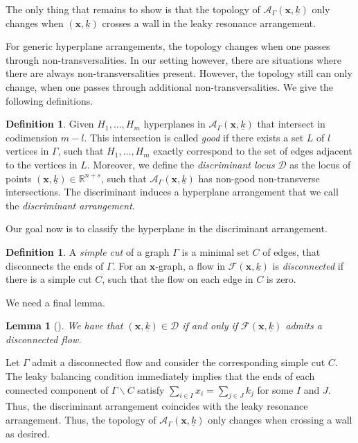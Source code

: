 \documentclass[10pt,a4paper,oneside,no-math,reqno]{amsart}%
\theoremstyle{plain}
\newtheorem{lemma}[theorem]{Lemma}
\theoremstyle{definition}
\newtheorem{definition}[theorem]{Definition}
\theoremstyle{remark}
\numberwithin{equation}{section}
\newcommand{\1}{\mathds{1}}
\newcommand{\<}{\langle}
\renewcommand{\>}{\rangle}
\begin{document}
 
 The only thing that remains to show is that the topology of $\mathcal{A}_\Gamma(\textbf{x},\underline{k})$ only changes when $(\textbf{x},\underline{k})$ crosses a wall in the leaky resonance arrangement.

 For generic hyperplane arrangements, the topology changes when one passes through non-transversalities. In our setting however, there are situations where there are always non-transversalities present. However, the topology still can only change, when one passes through additional non-transversalities. We give the following definitions.

 \begin{definition}
     Given $H_1,\dots,H_m$ hyperplanes in $\mathcal{A}_\Gamma(\textbf{x},\underline{k})$ that intersect in codimension $m-l$. This intersection is called \emph{good} if there exists a set $L$ of $l$ vertices in $\Gamma$, such that $H_1,\dots,H_m$ exactly correspond to the set of edges adjacent to the vertices in $L$. Moreover, we define the \emph{discriminant locus} $\mathcal{D}$ as the locus of points $(\textbf{x},\underline{k})\in\mathbb{R}^{n+s}$, such that $\mathcal{A}_\Gamma(\textbf{x},\underline{k})$ has non-good non-transverse intersections. The discriminant induces a hyperplane arrangement that we call the \emph{discriminant arrangement}.
 \end{definition}

 Our goal now is to classify the hyperplane in the discriminant arrangement.

 \begin{definition}
     A \emph{simple cut} of a graph $\Gamma$ is a minimal set $C$ of edges, that disconnects the ends of $\Gamma$. For an $\textbf{x}$-graph, a flow in $\mathcal{F}(\textbf{x},\underline{k})$ is \emph{disconnected} if there is a simple cut $C$, such that the flow on each edge in $C$ is zero.
 \end{definition}


We need a final lemma.

\begin{lemma}[{\cite[Lemma 3.8]{CJM11}}]
   We have that $(\textbf{x},\underline{k})\in\mathcal{D}$ if and only if $\mathcal{F}(\textbf{x},\underline{k})$ admits a disconnected flow.
\end{lemma}


Let $\Gamma$ admit a disconnected flow and consider the corresponding simple cut $C$. The leaky balancing condition immediately implies that the ends of each connected component of $\Gamma\backslash C$ satisfy $\sum_{i\in I} x_i=\sum_{j\in J}k_j$ for some $I$ and $J$. Thus, the discriminant arrangement coincides with the leaky resonance arrangement. Thus, the topology of $\mathcal{A}_\Gamma(\textbf{x},\underline{k})$ only changes when crossing a wall as desired.
\end{document}
